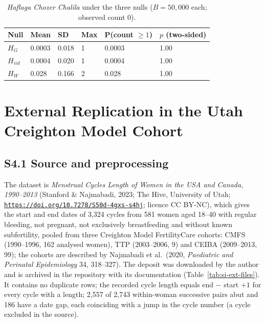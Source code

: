 \documentclass[12pt]{article}
\newcommand{\HG}{H_{G}}
\newcommand{\HI}{H_{iid}}
\newcommand{\HW}{H_{W}}
\providecommand{\doi}{}
\renewcommand{\doi}[1]{\href{https://doi.org/#1}{\nolinkurl{https://doi.org/#1}}}
\begin{document}
\begin{table}[!htbp]
\centering
\caption{\textit{Haflaga Chozer Chalila} under the three nulls ($B = 50{,}000$ each;
  observed count 0).}
\label{tab:si-hcc}
\smallskip
\begin{tabular}{L{2.2cm} C{1.6cm} C{1.6cm} C{1.6cm} C{2.6cm} C{2.0cm}}
\toprule
\textbf{Null} & \textbf{Mean} & \textbf{SD} & \textbf{Max} & \textbf{P(count $\geq 1$)} & \textbf{$p$ (two-sided)} \\
\midrule
$\HG$   & 0.0003 & 0.018 & 1 & 0.0003 & 1.00 \\
$\HI$   & 0.0004 & 0.020 & 1 & 0.0004 & 1.00 \\
$\HW$   & 0.028  & 0.166 & 2 & 0.028  & 1.00 \\
\bottomrule
\end{tabular}
\end{table}

\section{External Replication in the Utah Creighton Model Cohort}
\label{sec:si-ext}

\subsection*{S4.1 Source and preprocessing}

The dataset is \textit{Menstrual Cycles Length of Women in the USA and Canada, 1990--2013}
(Stanford \& Najmabadi, 2023; The Hive, University of Utah;
\doi{10.7278/S50d-4gxs-s4hj}; licence CC BY-NC), which gives the start and end dates of
3,324 cycles from 581 women aged 18--40 with regular bleeding, not pregnant, not
exclusively breastfeeding and without known subfertility, pooled from three Creighton
Model FertilityCare cohorts: CMFS (1990--1996, 162 analysed women), TTP (2003--2006, 9) and
CEIBA (2009--2013, 99); the cohorts are described by Najmabadi et al.\ (2020,
\textit{Paediatric and Perinatal Epidemiology} 34, 318--327). The deposit was downloaded by
the author and is archived in the repository with its documentation
(Table~\ref{tab:si-ext-files}). It contains no duplicate rows; the recorded cycle length
equals end $-$ start $+ 1$ for every cycle with a length; 2,557 of 2,743 within-woman
successive pairs abut and 186 have a date gap, each coinciding with a jump in the cycle
number (a cycle excluded in the source).
\end{document}
